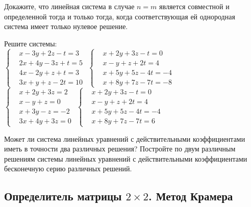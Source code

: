 \begin{problems}
\item
Докажите, что линейная система в случае $n = m$ является совместной и
определенной тогда и только тогда, когда соответствующая ей однородная система
имеет только нулевое решение.

\item
Решите системы:
\\[1ex]
\sbp
\(\left\{\begin{aligned}
&   x - 3 y + 2 z - t
=
    3
\\
&   2 x + 4 y - 3 z + t
=
    5
\\
&   4 x - 2 y + z + t
=
    3
\\
&   3 x + y + z - 2 t
=
    10
\end{aligned}\right.\)
\qquad
\sbp
\(\left\{\begin{aligned}
&   x + 2 y + 3 z - t
=
    0
\\
&   x - y + z + 2 t
=
    4
\\
&   x + 5 y + 5 z - 4 t
=
    -4
\\
&   x + 8 y + 7 z - 7 t
=
    -8
\end{aligned}\right.\)
\\[1ex]
\sbp
\(\left\{\begin{aligned}
&   x + 2 y + 3 z
=
    2
\\
&   x - y + z
=
    0
\\
&   x + 3 y - z
=
    -2
\\
&   3 x + 4 y + 3 z
=
    0
\end{aligned}\right.\)
\qquad
\sbp
\(\left\{\begin{aligned}
&   x + 2 y + 3 z - t
=
    0
\\
&   x - y + z + 2 t
=
    4
\\
&   x + 5 y + 5 z - 4 t
=
    -4
\\
&   x + 8 y + 7 z - 7 t
=
    6
\end{aligned}\right.\)

\item
Может ли система линейных уравнений с действительными коэффициентами
иметь в точности два различных решения?
Постройте по двум различным решениям системы линейных уравнений с
действительными коэффициентами бесконечную серию различных решений.

\end{problems}

\subsection*{Определитель матрицы $2 \times 2$. Метод Крамера}

